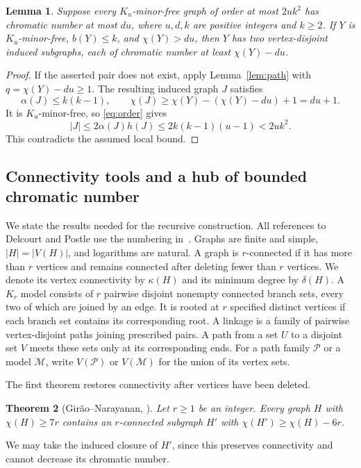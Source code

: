 \documentclass[11pt]{article}
\newtheorem{theorem}{Theorem}
\newtheorem{lemma}[theorem]{Lemma}
\begin{document}
\begin{lemma}\label{lem:separation}
Suppose every $K_u$-minor-free graph of order at most $2uk^2$ has
chromatic number at most $du$, where $u,d,k$ are positive integers and
$k\ge2$. If $Y$ is $K_u$-minor-free, $b(Y)\le k$, and $\chi(Y)>du$,
then $Y$ has two vertex-disjoint induced subgraphs, each of chromatic
number at least $\chi(Y)-du$.
\end{lemma}
\begin{proof}
If the asserted pair does not exist, apply Lemma~\ref{lem:path} with
$q=\chi(Y)-du\ge1$. The resulting induced graph $J$ satisfies
\[
 \alpha(J)\le k(k-1),\qquad
 \chi(J)\ge\chi(Y)-(\chi(Y)-du)+1=du+1.
\]
It is $K_u$-minor-free, so \eqref{eq:order} gives
\[
 |J|\le2\alpha(J)h(J)
 \le2k(k-1)(u-1)<2uk^2.
\]
This contradicts the assumed local bound.
\end{proof}

\subsection{Connectivity tools and a hub of bounded chromatic number}

We state the results needed for the recursive construction. All references
to Delcourt and Postle use the numbering in~\cite{DP}.
Graphs are finite and simple, $|H|=|V(H)|$, and logarithms are natural.
A graph is $r$-connected if it has more than $r$ vertices and remains
connected after deleting fewer than $r$ vertices. We denote its vertex
connectivity by $\kappa(H)$ and its minimum degree by $\delta(H)$.
A $K_r$ model consists of $r$ pairwise disjoint nonempty connected branch
sets, every two of which are joined by an edge. It is rooted at $r$
specified distinct vertices if each branch set contains its corresponding
root. A linkage is a family of pairwise vertex-disjoint paths joining
prescribed pairs. A path from a set $U$ to a disjoint set $V$ meets these
sets only at its corresponding ends. For a path family $\mathcal P$ or
a model $\mathcal M$, write $V(\mathcal P)$ or $V(\mathcal M)$ for the
union of its vertex sets.

The first theorem restores connectivity after vertices have been deleted.
\begin{theorem}[Gir\~ao--Narayanan, {\cite[Theorem~5.1]{DP}}]
\label{thm:connectivity}
Let $r\ge1$ be an integer. Every graph $H$ with $\chi(H)\ge7r$
contains an $r$-connected subgraph $H'$ with
$\chi(H')\ge\chi(H)-6r$.
\end{theorem}
We may take the induced closure of $H'$, since this preserves connectivity
and cannot decrease its chromatic number.
\end{document}

